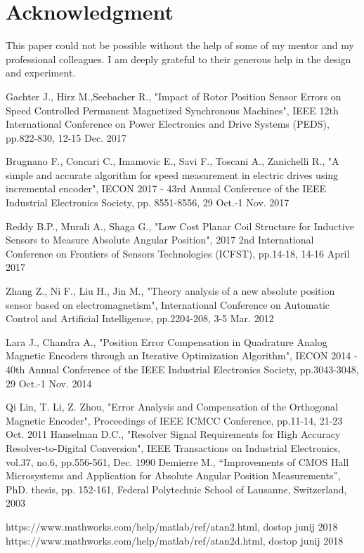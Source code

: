 \documentclass[a4paper]{article}
\begin{document}
\section*{Acknowledgment}
This paper could not be possible without the help of some of my mentor and my professional colleagues. I am deeply grateful to their generous help in the design and experiment.

\small
\begin{thebibliography}{1}
 Gachter J., Hirz M.,Seebacher R., "Impact of Rotor Position Sensor Errors on Speed
Controlled Permanent Magnetized Synchronous
Machines", IEEE 12th International Conference on Power Electronics and Drive Systems (PEDS), pp.822-830, 12-15 Dec. 2017

 Brugnano F., Concari C., Imamovic E., Savi F., Toscani  A., Zanichelli R., "A simple and accurate algorithm for speed measurement in electric drives using incremental encoder",
IECON 2017 - 43rd Annual Conference of the IEEE Industrial Electronics Society, pp. 8551-8556, 29 Oct.-1 Nov. 2017


 Reddy B.P., Murali A., Shaga G., "Low Cost Planar Coil Structure for Inductive Sensors to Measure Absolute Angular
Position", 2017 2nd International Conference on Frontiers of Sensors Technologies (ICFST), pp.14-18, 14-16 April 2017




 Zhang Z., Ni F., Liu H., Jin M., "Theory analysis of a new absolute position sensor based on electromagnetism", International Conference on Automatic Control and Artificial Intelligence, pp.2204-208, 3-5 Mar. 2012

 Lara J., Chandra A., "Position Error Compensation in Quadrature
Analog Magnetic Encoders through an Iterative
Optimization Algorithm",  IECON 2014 - 40th Annual Conference of the IEEE Industrial Electronics Society, pp.3043-3048, 29 Oct.-1 Nov. 2014 
	
 Qi Lin, T. Li, Z. Zhou, "Error Analysis and Compensation
of the Orthogonal Magnetic Encoder", Proceedings of IEEE ICMCC
Conference, pp.11-14, 21-23 Oct. 2011
 Hanselman D.C., "Resolver Signal Requirements for High Accuracy
Resolver-to-Digital Conversion", IEEE Transactions on Industrial
Electronics, vol.37, no.6, pp.556-561, Dec. 1990 
 Demierre M., “Improvements of CMOS Hall Microsystems and
Application for Absolute Angular Position Measurements”, PhD. thesis,
pp. 152-161, Federal Polytechnic School of Lausanne, Switzerland, 2003


 https://www.mathworks.com/help/matlab/ref/atan2.html, dostop junij 2018
 https://www.mathworks.com/help/matlab/ref/atan2d.html, dostop junij 2018



\end{thebibliography}
\end{document}
